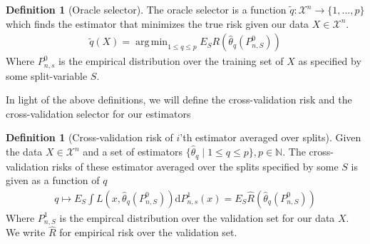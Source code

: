 \documentclass[11pt, a4paper]{article}
\DeclareMathOperator*{\argmin}{arg\,min}
\theoremstyle{definition}
\newtheorem{definition}[theorem]{Definition}
\theoremstyle{remark}
\newcommand{\cl}{q}
\begin{document}
\begin{definition}[Oracle selector]
    The oracle selector is a function $ \tilde{\cl}: \mathcal{X}^{n} \to \{1,...,p\} $  which finds the estimator that minimizes the true risk given our data $ X \in \mathcal{X}^{n}$. 
    \begin{align*}
        \tilde{\cl}(X) = \argmin_{1 \leq \cl \leq p} E_S R( \hat{\theta} _\cl (P_{n,S}^0 )) 
    \end{align*}
    Where $ P_{n ,s}^{0} $ is the empirical distribution over the training set of $ X $ as specified by some split-variable $ S $. 
\end{definition}
In light of the above definitions, we will define the cross-validation risk and the cross-validation selector for our estimators

\begin{definition}[Cross-validation risk of $ i $'th estimator averaged over splits]
    Given the data $ X \in \mathcal{X}^{n} $ and a set of estimators $ \{ \hat{\theta}_{\cl} \mid 1 \leq \cl \leq p \}, p \in \mathbb{N} $. The cross-validation risks of these estimator averaged over the splits specified by some $ S $ is given as a function of $ \cl $ 
    \begin{align*}
        \cl \mapsto E_S \int L(x, \hat{\theta}_{\cl}(P_{n,S}^{0}) ) \mathrm{d}P_{n, s}^{1}(x) = E_S \hat{R}( \hat{\theta}_\cl(P_{n,S}^{0})) 
    \end{align*}
    Where $ P_{n,S}^{1} $ is the empircal distribution over the validation set for our data $ X $. We write $ \hat{R} $ for empirical risk over the validation set. 
\end{definition}
\end{document}
